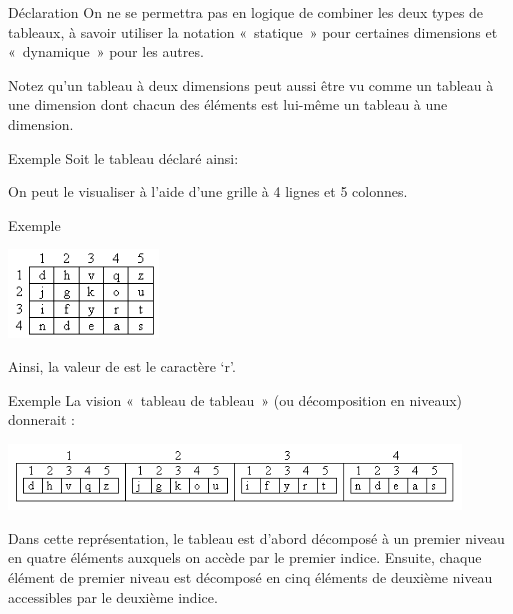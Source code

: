 \begin{frame}{Déclaration}
	On ne se permettra pas en logique de
	combiner les deux types de tableaux, à savoir utiliser la notation
	«~statique~» pour certaines dimensions et «~dynamique~» pour les
	autres.

	Notez qu'un tableau à deux dimensions peut aussi être
	vu comme un tableau à une dimension dont chacun des éléments est
	lui-même un tableau à une dimension.
\end{frame}

\begin{frame}{Exemple} 
	Soit le tableau déclaré ainsi:


	On peut le visualiser à l’aide d’une grille à 4 lignes et 5 colonnes.
\end{frame}

\begin{frame}{Exemple}
	\begin{center}
	\includegraphics[width=4cm]{image/tab2d-vision-tab2d}
	\end{center}

	Ainsi, la valeur de  
	est le caractère ‘r’. 
\end{frame}

\begin{frame}{Exemple}
		La vision «~tableau de tableau~» 
	(ou décomposition en niveaux)
	donnerait :

	\begin{center}
	\includegraphics[width=0.9\textwidth]{image/tab2d-vision-tabtab}
	\end{center}

	Dans cette représentation, le tableau  est
	d’abord décomposé à un premier niveau en quatre éléments auxquels on
	accède par le premier indice. Ensuite, chaque élément de premier niveau
	est décomposé en cinq éléments de deuxième niveau accessibles par le
	deuxième indice.
\end{frame}

